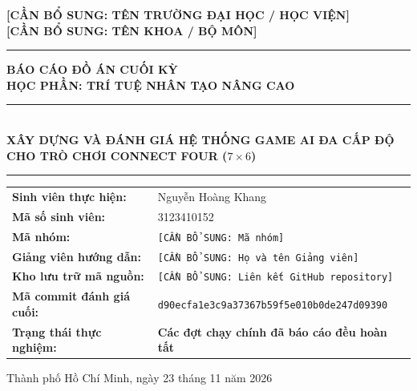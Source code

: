 \documentclass[11pt, a4paper]{article}
\begin{document}
\begin{titlepage}
    \centering
    \vspace*{0.5cm}
    {\large \textbf{[CẦN BỔ SUNG: TÊN TRƯỜNG ĐẠI HỌC / HỌC VIỆN]}}\\[0.2cm]
    {\normalsize \textbf{[CẦN BỔ SUNG: TÊN KHOA / BỘ MÔN]}}\\[0.4cm]
    \rule{0.6\textwidth}{0.6pt}

    \vspace{2.0cm}
    {\large \textbf{BÁO CÁO ĐỒ ÁN CUỐI KỲ}}\\[0.3cm]
    {\large \textbf{HỌC PHẦN: TRÍ TUỆ NHÂN TẠO NÂNG CAO}}

    \vspace{1.5cm}
    \rule{\textwidth}{1.2pt}\\[0.4cm]
    {\Large \textbf{XÂY DỰNG VÀ ĐÁNH GIÁ HỆ THỐNG GAME AI ĐA CẤP ĐỘ CHO TRÒ CHƠI CONNECT FOUR ($7 \times 6$)}}\\[0.4cm]
    \rule{\textwidth}{1.2pt}

    \vspace{2.2cm}
    \begin{tabular}{@{} p{5.2cm} p{8.8cm} @{}}
        \textbf{Sinh viên thực hiện:} & Nguyễn Hoàng Khang \\
        \textbf{Mã số sinh viên:} & 3123410152 \\
        \textbf{Mã nhóm:} & \texttt{[CẦN BỔ SUNG: Mã nhóm]} \\
        \textbf{Giảng viên hướng dẫn:} & \texttt{[CẦN BỔ SUNG: Họ và tên Giảng viên]} \\
        \textbf{Kho lưu trữ mã nguồn:} & \texttt{[CẦN BỔ SUNG: Liên kết GitHub repository]} \\
        \textbf{Mã commit đánh giá cuối:} & \texttt{d90ecfa1e3c9a37367b59f5e010b0de247d09390} \\
        \textbf{Trạng thái thực nghiệm:} & \textbf{Các đợt chạy chính đã báo cáo đều hoàn tất} \\
    \end{tabular}

    \vfill
    {\normalsize Thành phố Hồ Chí Minh, ngày 23 tháng 11 năm 2026}
\end{titlepage}

\end{document}
